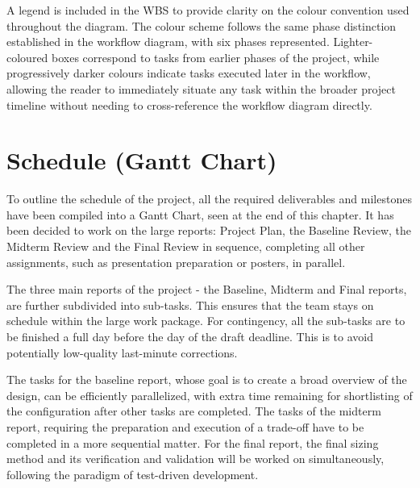A legend is included in the WBS to provide clarity on the colour convention used throughout the diagram. The colour scheme follows the same phase distinction established in the workflow diagram, with six phases represented. Lighter-coloured boxes correspond to tasks from earlier phases of the project, while progressively darker colours indicate tasks executed later in the workflow, allowing the reader to immediately situate any task within the broader project timeline without needing to cross-reference the workflow diagram directly.








\section{Schedule (Gantt Chart)}
To outline the schedule of the project, all the required deliverables and milestones have been compiled into a Gantt Chart, seen at the end of this chapter. It has been decided to work on the large reports: Project Plan, the Baseline Review, the Midterm Review and the Final Review in sequence, completing all other assignments, such as presentation preparation or posters, in parallel.

The three main reports of the project - the Baseline, Midterm and Final reports, are further subdivided into sub-tasks. This ensures that the team stays on schedule within the large work package. For contingency, all the sub-tasks are to be finished a full day before the day of the draft deadline. This is to avoid potentially low-quality last-minute corrections.

The tasks for the baseline report, whose goal is to create a broad overview of the design, can be efficiently parallelized, with extra time remaining for shortlisting of the configuration after other tasks are completed. The tasks of the midterm report, requiring the preparation and execution of a trade-off have to be completed in a more sequential matter. For the final report, the final sizing method and its verification and validation will be worked on simultaneously, following the paradigm of test-driven development.




